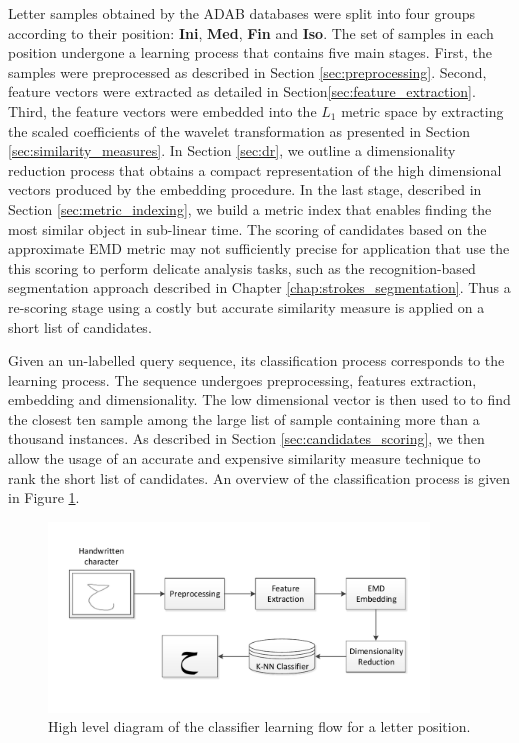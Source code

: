 \iftoggle{edit-mode}{\hspace{0pt}\marginpar{The learning process}}{}
Letter samples obtained by the ADAB databases were split into four groups according to their position: \textbf{Ini}, \textbf{Med}, \textbf{Fin} and \textbf{Iso}. 
The set of samples in each position undergone a learning process that contains five main stages.
First, the samples were preprocessed as described in Section \ref{sec:preprocessing}.
Second, feature vectors were extracted as detailed in Section\ref{sec:feature_extraction}.
Third, the feature vectors were embedded into the $L_1$ metric space by extracting the scaled coefficients of the wavelet transformation as presented in Section \ref{sec:similarity_measures}. 
In Section \ref{sec:dr}, we outline a dimensionality reduction process that obtains a compact representation of the high dimensional vectors produced by the embedding procedure.
In the last stage, described in Section \ref{sec:metric_indexing}, we build a metric index that enables finding the most similar object in sub-linear time.
The scoring of candidates based on the approximate EMD metric may not sufficiently precise for application that use the this scoring to perform delicate analysis tasks, such as the recognition-based segmentation approach described in Chapter \ref{chap:strokes_segmentation}.
Thus a re-scoring stage using a costly but accurate similarity measure is applied on a short list of candidates.   

\iftoggle{edit-mode}{\hspace{0pt}\marginpar{The recognition process}}{}
Given an un-labelled query sequence, its classification process corresponds to the learning process.
The sequence undergoes preprocessing, features extraction, embedding and dimensionality.
The low dimensional vector is then used to to find the closest ten sample among the large list of sample containing more than a thousand instances.
As described in Section \ref{sec:candidates_scoring}, we then allow the usage of an accurate and expensive similarity measure technique to rank the short list of candidates. 
An overview of the classification process is given in Figure \ref{fig:letters_classifier_learning_flow}.

\begin{figure}
\centering
\includegraphics[width=0.9\textwidth]{./figures/letters_classifier_learning_flow}       
\caption{High level diagram of the classifier learning flow for a letter position.}
\label{fig:letters_classifier_learning_flow}
\end{figure}


